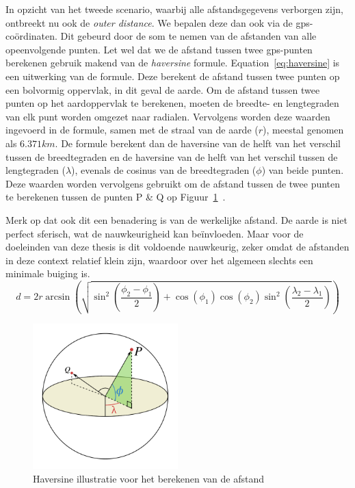 In opzicht van het tweede scenario, waarbij alle afstandsgegevens verborgen
zijn, ontbreekt nu ook de \textit{outer distance}. We bepalen deze dan ook via
de \ac{gps}-coördinaten. Dit gebeurd door de som te nemen van de afstanden van
alle opeenvolgende punten. Let wel dat we de afstand tussen twee
\ac{gps}-punten berekenen gebruik makend van de \textit{haversine} formule.
Equation~\ref{eq:haversine} is een uitwerking van de formule. Deze berekent de
afstand tussen twee punten op een bolvormig oppervlak, in dit geval de aarde.
Om de afstand tussen twee punten op het aardoppervlak te berekenen, moeten de
breedte- en lengtegraden van elk punt worden omgezet naar radialen. Vervolgens
worden deze waarden ingevoerd in de formule, samen met de straal van de aarde
($r$), meestal genomen als $6.371 km$. De formule berekent dan de haversine van
de helft van het verschil tussen de breedtegraden en de haversine van de helft
van het verschil tussen de lengtegraden ($\lambda$), evenals de cosinus van de
breedtegraden ($\phi$) van beide punten. Deze waarden worden vervolgens
gebruikt om de afstand tussen de twee punten te berekenen tussen de punten P \&
Q op Figuur~\ref{fig:haversine}~\cite{sheppard1922practical}.

Merk op dat ook dit een benadering is van de werkelijke afstand. De aarde is
niet perfect sferisch, wat de nauwkeurigheid kan beïnvloeden. Maar voor de
doeleinden van deze thesis is dit voldoende nauwkeurig, zeker omdat de
afstanden in deze context relatief klein zijn, waardoor over het algemeen
slechts een minimale buiging is.
\begin{equation}\label{eq:haversine}
    d = 2r \arcsin\left(\sqrt{\sin^2\left(\frac{\phi_2-\phi_1}{2}\right)+\cos(\phi_1)\cos(\phi_2)\sin^2\left(\frac{\lambda_2-\lambda_1}{2}\right)}\right)
\end{equation}
\begin{figure}[h]
    \centering
    \includegraphics[width=0.5\textwidth]{fig/haversine.png}
    \caption{Haversine illustratie voor het berekenen van de afstand\cite{Distance97:online}}\label{fig:haversine}
\end{figure}

